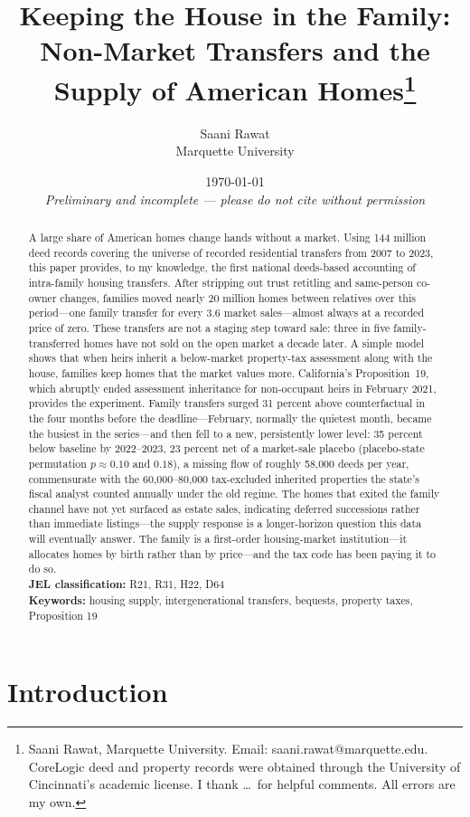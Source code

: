 \documentclass[12pt, letterpaper]{article}
\title{Keeping the House in the Family:\\ Non-Market Transfers and the Supply of American Homes\thanks{Saani Rawat, Marquette University. Email: saani.rawat@marquette.edu. CoreLogic deed and property records were obtained through the University of Cincinnati's academic license. I thank \dots\ for helpful comments. All errors are my own.}}
\author{Saani Rawat\\Marquette University}
\date{\today\\\vspace{4pt}\textit{Preliminary and incomplete --- please do not cite without permission}}
\begin{document}
\maketitle

\begin{abstract}
\noindent A large share of American homes change hands without a market.
Using 144 million deed records covering the universe of recorded residential
transfers from 2007 to 2023, this paper provides, to my knowledge, the first
national deeds-based accounting of intra-family housing transfers. After
stripping out trust retitling and same-person co-owner changes, families
moved nearly 20 million homes between relatives over this period---one
family transfer for every 3.6 market sales---almost always at a recorded
price of zero. These transfers are not a staging step toward sale: three in
five family-transferred homes have not sold on the open market a decade
later. A simple model shows that when heirs inherit a below-market
property-tax assessment along with the house, families keep homes that the
market values more. California's Proposition~19, which abruptly ended
assessment inheritance for non-occupant heirs in February 2021, provides the
experiment. Family transfers surged 31 percent above counterfactual in the
four months before the deadline---February, normally the quietest month,
became the busiest in the series---and then fell to a new, persistently
lower level: 35 percent below baseline by 2022--2023, 23 percent net of a
market-sale placebo (placebo-state permutation $p \approx 0.10$ and $0.18$),
a missing flow of roughly 58,000 deeds per year, commensurate with the
60,000--80,000 tax-excluded inherited properties the state's fiscal analyst
counted annually under the old regime. The homes that exited the family
channel have not yet surfaced as estate sales, indicating deferred
successions rather than immediate listings---the supply response is a
longer-horizon question this data will eventually answer. The family is a
first-order housing-market institution---it allocates homes by birth rather
than by price---and the tax code has been paying it to do so. \\
\textbf{JEL classification:} R21, R31, H22, D64 \\
\textbf{Keywords:} housing supply, intergenerational transfers, bequests, property taxes, Proposition 19
\end{abstract}

\clearpage

\section{Introduction}\label{sec:intro}
\end{document}
